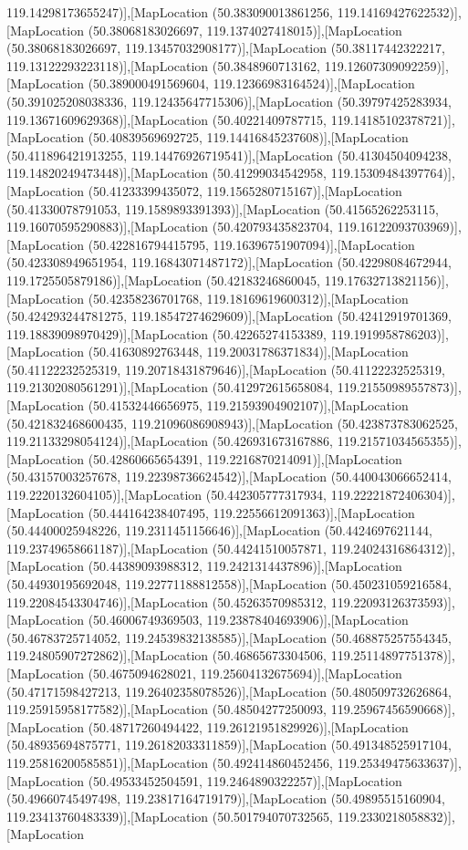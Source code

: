 119.14298173655247)],[MapLocation (50.383090013861256, 119.14169427622532)],[MapLocation (50.38068183026697, 119.1374027418015)],[MapLocation (50.38068183026697, 119.13457032908177)],[MapLocation (50.38117442322217, 119.13122293223118)],[MapLocation (50.3848960713162, 119.12607309092259)],[MapLocation (50.389000491569604, 119.12366983164524)],[MapLocation (50.391025208038336, 119.12435647715306)],[MapLocation (50.39797425283934, 119.13671609629368)],[MapLocation (50.40221409787715, 119.14185102378721)],[MapLocation (50.40839569692725, 119.14416845237608)],[MapLocation (50.411896421913255, 119.14476926719541)],[MapLocation (50.41304504094238, 119.14820249473448)],[MapLocation (50.41299034542958, 119.15309484397764)],[MapLocation (50.41233399435072, 119.1565280715167)],[MapLocation (50.41330078791053, 119.1589893391393)],[MapLocation (50.41565262253115, 119.16070595290883)],[MapLocation (50.420793435823704, 119.16122093703969)],[MapLocation (50.422816794415795, 119.16396751907094)],[MapLocation (50.423308949651954, 119.16843071487172)],[MapLocation (50.42298084672944, 119.1725505879186)],[MapLocation (50.42183246860045, 119.17632713821156)],[MapLocation (50.42358236701768, 119.18169619600312)],[MapLocation (50.424293244781275, 119.18547274629609)],[MapLocation (50.42412919701369, 119.18839098970429)],[MapLocation (50.42265274153389, 119.1919958786203)],[MapLocation (50.41630892763448, 119.20031786371834)],[MapLocation (50.41122232525319, 119.20718431879646)],[MapLocation (50.41122232525319, 119.21302080561291)],[MapLocation (50.412972615658084, 119.21550989557873)],[MapLocation (50.41532446656975, 119.21593904902107)],[MapLocation (50.421832468600435, 119.21096086908943)],[MapLocation (50.423873783062525, 119.21133298054124)],[MapLocation (50.426931673167886, 119.21571034565355)],[MapLocation (50.42860665654391, 119.2216870214091)],[MapLocation (50.43157003257678, 119.22398736624542)],[MapLocation (50.440043066652414, 119.2220132604105)],[MapLocation (50.442305777317934, 119.22221872406304)],[MapLocation (50.444164238407495, 119.22556612091363)],[MapLocation (50.44400025948226, 119.2311451156646)],[MapLocation (50.4424697621144, 119.23749658661187)],[MapLocation (50.44241510057871, 119.24024316864312)],[MapLocation (50.44389093988312, 119.2421314437896)],[MapLocation (50.44930195692048, 119.22771188812558)],[MapLocation (50.450231059216584, 119.22084543304746)],[MapLocation (50.45263570985312, 119.22093126373593)],[MapLocation (50.46006749369503, 119.23878404693906)],[MapLocation (50.46783725714052, 119.24539832138585)],[MapLocation (50.468875257554345, 119.24805907272862)],[MapLocation (50.46865673304506, 119.25114897751378)],[MapLocation (50.4675094628021, 119.25604132675694)],[MapLocation (50.47171598427213, 119.26402358078526)],[MapLocation (50.480509732626864, 119.25915958177582)],[MapLocation (50.48504277250093, 119.25967456590668)],[MapLocation (50.48717260494422, 119.26121951829926)],[MapLocation (50.48935694875771, 119.26182033311859)],[MapLocation (50.491348525917104, 119.25816200585851)],[MapLocation (50.492414860452456, 119.25349475633637)],[MapLocation (50.49533452504591, 119.2464890322257)],[MapLocation (50.49660745497498, 119.23817164719179)],[MapLocation (50.49895515160904, 119.23413760483339)],[MapLocation (50.501794070732565, 119.2330218058832)],[MapLocation 